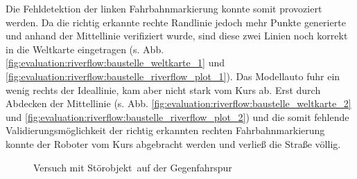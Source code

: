 Die Fehldetektion der linken Fahrbahnmarkierung konnte somit provoziert werden. Da die richtig erkannte rechte Randlinie jedoch mehr Punkte generierte und anhand der Mittellinie verifiziert wurde, sind diese zwei Linien noch korrekt in die Weltkarte eingetragen (s. Abb. \ref{fig:evaluation:riverflow:baustelle_weltkarte_1} und \ref{fig:evaluation:riverflow:baustelle_riverflow_plot_1}). Das Modellauto fuhr ein wenig rechts der Ideallinie, kam aber nicht stark vom Kurs ab.
Erst durch Abdecken der Mittellinie (s. Abb. \ref{fig:evaluation:riverflow:baustelle_weltkarte_2} und \ref{fig:evaluation:riverflow:baustelle_riverflow_plot_2}) und die somit fehlende Validierungsmöglichkeit der richtig erkannten rechten Fahrbahnmarkierung konnte der Roboter vom Kurs abgebracht werden und verließ die Straße völlig.
\begin{figure}[htbp] %
{}
\hfill
{}
\hfill
{}
\hfill
{}
\caption{Versuch mit \glqq Störobjekt\grqq\ auf der Gegenfahrspur}
\label{fig:evaluation:riverflow:baustelle}
\end{figure}
